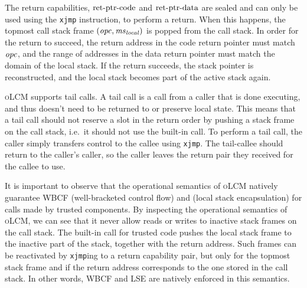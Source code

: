 \documentclass{jfp}
\newcommand{\srccm}{\textsc{oLCM}}
\begin{document}
The return capabilities, $\mathrm{ret\text{-}ptr\text{-}code}$ and $\mathrm{ret\text{-}ptr\text{-}data}$ are sealed and can only be used using the \texttt{xjmp} instruction, to perform a return.
When this happens, the topmost call stack frame $(\mathit{opc},\mathit{ms}_{\mathit{local}})$ is popped from the call stack.
In order for the return to succeed, the return address in the code return pointer must match $\mathit{opc}$, and the range of addresses in the data return pointer must match the domain of the local stack.
If the return succeeds, the stack pointer is reconstructed, and the local stack becomes part of the active stack again.

\srccm{} supports tail calls.
A tail call is a call from a caller that is done executing, and thus doesn't need to be returned to or preserve local state.
This means that a tail call should not reserve a slot in the return order by pushing a stack frame on the call stack, i.e.\ it should not use the built-in call.
To perform a tail call, the caller simply transfers control to the callee using \texttt{xjmp}.
The tail-callee should return to the caller's caller, so the caller leaves the return pair they received for the callee to use.

It is important to observe that the operational semantics of \srccm{} natively guarantee WBCF (well-bracketed control flow) and (local stack encapsulation) for calls made by trusted components.
By inspecting the operational semantics of \srccm{}, we can see that it never allow reads or writes to inactive stack frames on the call stack.
The built-in call for trusted code pushes the local stack frame to the inactive part of the stack, together with the return address. 
Such frames can be reactivated by \texttt{xjmp}ing to a return capability pair, but only for the topmost stack frame and if the return address corresponds to the one stored in the call stack.
In other words, WBCF and LSE are natively enforced in this semantics.
\end{document}
